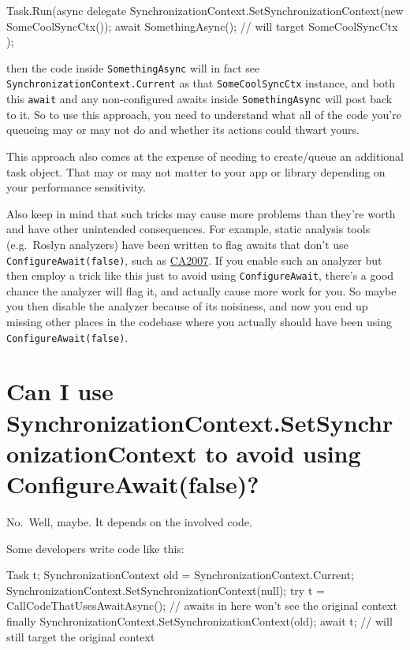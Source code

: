 \documentclass[a4paper,12pt,notitlepage,twoside,openright]{article}
\begin{document}
\begin{csharpcode}
Task.Run(async delegate
{
    SynchronizationContext.SetSynchronizationContext(new SomeCoolSyncCtx());
    await SomethingAsync(); // will target SomeCoolSyncCtx
});
\end{csharpcode}

then the code inside \texttt{SomethingAsync} will in fact see
\texttt{SynchronizationContext.Current} as that \texttt{SomeCoolSyncCtx}
instance, and both this \texttt{await} and any non-configured awaits
inside \texttt{SomethingAsync} will post back to it. So to use this
approach, you need to understand what all of the code you're queueing
may or may not do and whether its actions could thwart yours.

This approach also comes at the expense of needing to create/queue an
additional task object. That may or may not matter to your app or
library depending on your performance sensitivity.

Also keep in mind that such tricks may cause more problems than they're
worth and have other unintended consequences. For example, static
analysis tools (e.g.~Roslyn analyzers) have been written to flag awaits
that don't use \texttt{ConfigureAwait(false)}, such as
\href{https://docs.microsoft.com/en-us/visualstudio/code-quality/ca2007?view=vs-2019}{CA2007}.
If you enable such an analyzer but then employ a trick like this just to
avoid using \texttt{ConfigureAwait}, there's a good chance the analyzer
will flag it, and actually cause more work for you. So maybe you then
disable the analyzer because of its noisiness, and now you end up
missing other places in the codebase where you actually should have been
using \texttt{ConfigureAwait(false)}.

\hypertarget{can-i-use-synchronizationcontext.setsynchronizationcontext-to-avoid-using-configureawaitfalse}{%
\section{Can I use SynchronizationContext.SetSynchronizationContext
to avoid using
ConfigureAwait(false)?}\label{can-i-use-synchronizationcontext.setsynchronizationcontext-to-avoid-using-configureawaitfalse}}

No.~Well, maybe. It depends on the involved code.

Some developers write code like this:

\begin{csharpcode}
Task t;
SynchronizationContext old = SynchronizationContext.Current;
SynchronizationContext.SetSynchronizationContext(null);
try
{
    t = CallCodeThatUsesAwaitAsync(); // awaits in here won't see the original context
}
finally { SynchronizationContext.SetSynchronizationContext(old); }
await t; // will still target the original context
\end{csharpcode}
\end{document}
